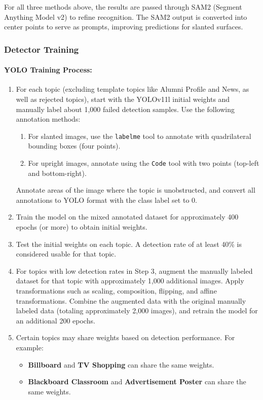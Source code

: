 For all three methods above, the results are passed through SAM2 (Segment Anything Model v2) to refine recognition. The SAM2 output is converted into center points to serve as prompts, improving predictions for slanted surfaces.

\subsubsection{Detector Training}

\paragraph{YOLO Training Process:}

\begin{enumerate}
    \item For each topic (excluding template topics like Alumni Profile and News, as well as rejected topics), start with the YOLOv11l initial weights and manually label about 1,000 failed detection samples. Use the following annotation methods:
    \begin{enumerate}
        \item For slanted images, use the \texttt{labelme} tool to annotate with quadrilateral bounding boxes (four points).
        \item For upright images, annotate using the \texttt{Code} tool with two points (top-left and bottom-right).
    \end{enumerate}
    Annotate areas of the image where the topic is unobstructed, and convert all annotations to YOLO format with the class label set to 0.
    \item Train the model on the mixed annotated dataset for approximately 400 epochs (or more) to obtain initial weights.
    \item Test the initial weights on each topic. A detection rate of at least 40\% is considered usable for that topic.
    \item For topics with low detection rates in Step 3, augment the manually labeled dataset for that topic with approximately 1,000 additional images. Apply transformations such as scaling, composition, flipping, and affine transformations. Combine the augmented data with the original manually labeled data (totaling approximately 2,000 images), and retrain the model for an additional 200 epochs.
    \item Certain topics may share weights based on detection performance. For example:
    \begin{itemize}
        \item \textbf{Billboard} and \textbf{TV Shopping} can share the same weights.
        \item \textbf{Blackboard Classroom} and \textbf{Advertisement Poster} can share the same weights.
    \end{itemize}
\end{enumerate}

